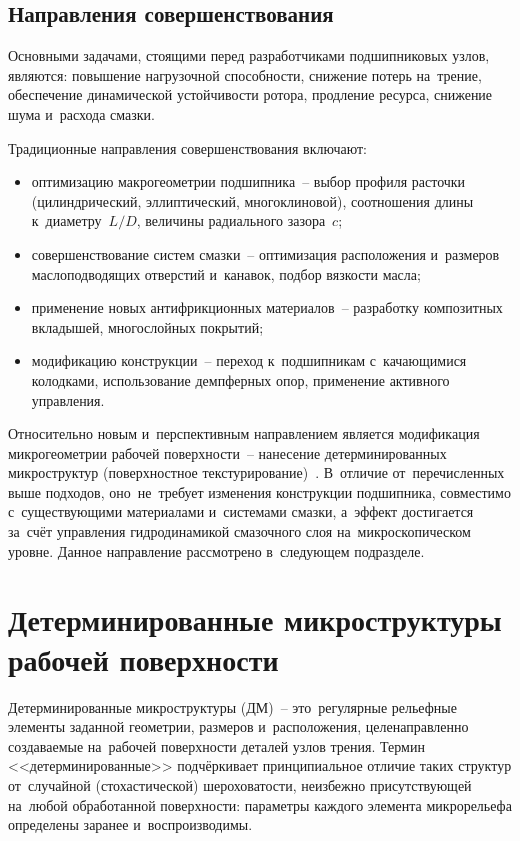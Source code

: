 \subsection{Направления совершенствования}

Основными задачами, стоящими перед разработчиками подшипниковых узлов, являются: повышение нагрузочной способности, снижение потерь на~трение, обеспечение динамической устойчивости ротора, продление ресурса, снижение шума и~расхода смазки.

Традиционные направления совершенствования включают:
\begin{itemize}
\item оптимизацию макрогеометрии подшипника~-- выбор профиля расточки (цилиндрический, эллиптический, многоклиновой), соотношения длины к~диаметру~$L/D$, величины радиального зазора~$c$;
\item совершенствование систем смазки~-- оптимизация расположения и~размеров маслоподводящих отверстий и~канавок, подбор вязкости масла;
\item применение новых антифрикционных материалов~-- разработку композитных вкладышей, многослойных покрытий;
\item модификацию конструкции~-- переход к~подшипникам с~качающимися колодками, использование демпферных опор, применение активного управления.
\end{itemize}

Относительно новым и~перспективным направлением является модификация микрогеометрии рабочей поверхности~-- нанесение детерминированных микроструктур (поверхностное текстурирование)~\cite{senatore2018,bashmur2024b}. В~отличие от~перечисленных выше подходов, оно~не~требует изменения конструкции подшипника, совместимо с~существующими материалами и~системами смазки, а~эффект достигается за~счёт управления гидродинамикой смазочного слоя на~микроскопическом уровне. Данное направление рассмотрено в~следующем подразделе.


\section{Детерминированные микроструктуры рабочей поверхности}

Детерминированные микроструктуры (ДМ)~-- это~регулярные рельефные элементы заданной геометрии, размеров и~расположения, целенаправленно создаваемые на~рабочей поверхности деталей узлов трения. Термин <<детерминированные>> подчёркивает принципиальное отличие таких структур от~случайной (стохастической) шероховатости, неизбежно присутствующей на~любой обработанной поверхности: параметры каждого элемента микрорельефа определены заранее и~воспроизводимы.

